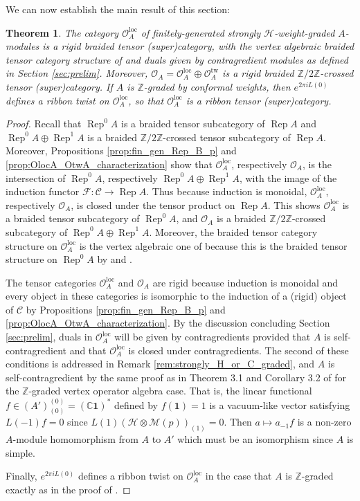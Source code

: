 \documentclass[11pt, reqno]{amsart}
\newtheorem{thm}{Theorem}[section]
\theoremstyle{definition}\newtheorem{defi}[thm]{Definition}
\theoremstyle{definition}\newtheorem{rem}[thm]{Remark}
\theoremstyle{definition}\newtheorem{exam}[thm]{Example}
\theoremstyle{definition}\newtheorem{assum}[thm]{Assumption}
\newcommand{\cH}{\mathcal{H}}
\newcommand{\cM}{\mathcal{M}}
\newcommand{\cF}{\mathcal{F}}
\newcommand{\cO}{\mathcal{O}}
\newcommand{\cC}{\mathcal{C}}
\newcommand{\CC}{\mathbb{C}}
\newcommand{\ZZ}{\mathbb{Z}}
\newcommand{\vac}{\mathbf{1}}
\newcommand{\Oloc}{\cO^{\mathrm{loc}}}
\newcommand{\Otw}{\cO^{\mathrm{tw}}}
\DeclareMathOperator{\rep}{Rep}
\newcommand{\repA}{\rep A}
\begin{document}
We can now establish the main result of this section:
\begin{thm}\label{thm:main_thm}
The category $\Oloc_A$ of finitely-generated strongly $\cH$-weight-graded $A$-modules is a rigid braided tensor (super)category, with the vertex algebraic braided tensor category structure of \cite{HLZ8} and duals given by contragredient modules as defined in Section \ref{sec:prelim}. Moreover, $\cO_A=\Oloc_A\oplus\Otw_A$ is a rigid braided $\ZZ/2\ZZ$-crossed tensor (super)category. If $A$ is $\ZZ$-graded by conformal weights, then $e^{2\pi i L(0)}$ defines a ribbon twist on $\Oloc_A$, so that $\Oloc_A$ is a ribbon tensor (super)category.
\end{thm}
\begin{proof}
Recall that $\rep^0A$ is a braided tensor subcategory of $\repA$ and $\rep^0 A\oplus\rep^1A$ is a braided $\ZZ/2\ZZ$-crossed tensor subcategory of $\repA$. Moreover, Propositions \ref{prop:fin_gen_Rep_B_p} and \ref{prop:OlocA_OtwA_characterization} show that  $\Oloc_A$, respectively $\cO_A$, is the intersection of $\rep^0A$, respectively $\rep^0A\oplus\rep^1A$, with the image of the induction functor $\cF:\cC\rightarrow\repA$. Thus because induction is monoidal, $\Oloc_A$, respectively $\cO_A$, is closed under the tensor product on $\repA$. This shows $\Oloc_A$ is a braided tensor subcategory of $\rep^0A$, and $\cO_A$ is a braided $\ZZ/2\ZZ$-crossed subcategory of $\rep^0A\oplus\rep^1A$.
Moreover, the braided tensor category structure on $\Oloc_A$ is the vertex algebraic one of \cite{HLZ8} because this is the braided tensor structure on $\rep^0A$ by \cite[Theorem 3.65]{CKM-exts} and \cite[Theorem 7.7]{CMY-completions}. 

The tensor categories $\Oloc_A$ and $\cO_A$ are rigid because induction is monoidal and every object in these categories is isomorphic to the induction of a (rigid) object of $\cC$ by Propositions \ref{prop:fin_gen_Rep_B_p} and \ref{prop:OlocA_OtwA_characterization}. By the discussion concluding Section \ref{sec:prelim}, duals in $\Oloc_A$ will be given by contragredients provided that $A$ is self-contragredient and that $\Oloc_A$ is closed under contragredients. The second of these conditions is addressed in Remark \ref{rem:strongly_H_or_C_graded}, and $A$ is self-contragredient by the same proof as in Theorem 3.1 and Corollary 3.2 of \cite{Li} for the $\ZZ$-graded vertex operator algebra case. That is, the linear functional $f\in (A')^{(0)}_{(0)} =(\CC\vac)^*$ defined by $f(\vac)=1$ is a vacuum-like vector satisfying $L(-1)f=0$ since $L(1)(\cH\otimes\cM(p))_{(1)}=0$. Then $a\mapsto a_{-1} f$ is a non-zero $A$-module homomorphism from $A$ to $A'$ which must be an isomorphism since $A$ is simple.

Finally, $e^{2\pi i L(0)}$ defines a ribbon twist on $\Oloc_A$ in the case that $A$ is $\ZZ$-graded exactly as in the proof of \cite[Theorem 4.1]{Hu-rig-mod}.
\end{proof}
\end{document}
